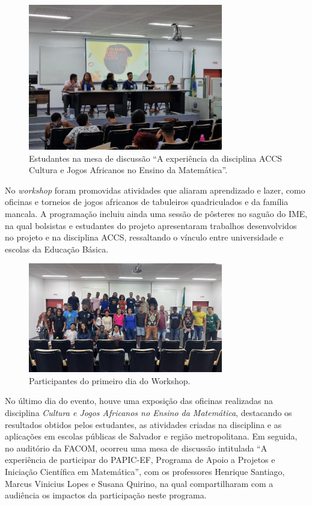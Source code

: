 \documentclass{hipatia}
\begin{document}
\begin{figure}[htb]
    \centering
    \includegraphics[width=8.5cm]{WAM2.jpg}
    \caption{Estudantes na mesa de discussão ``A experiência da disciplina ACCS Cultura e Jogos Africanos no Ensino da Matemática''.}
 \label{WAM2}
\end{figure}

No \textit{workshop} foram promovidas atividades que aliaram aprendizado e lazer, como oficinas e torneios de jogos africanos de tabuleiros quadriculados e da família mancala. A programação incluiu ainda uma sessão de pôsteres no saguão do IME, na qual bolsistas e estudantes do projeto apresentaram trabalhos desenvolvidos no projeto e na disciplina ACCS, ressaltando o vínculo entre universidade e escolas da Educação Básica.

\begin{figure}[htb]
    \centering
    \includegraphics[width=8.5cm]{WAM3.jpg}
    \caption{Participantes do primeiro dia do Workshop.}
 \label{WAM3}
\end{figure}

No último dia do evento, houve uma exposição das oficinas realizadas na disciplina \textit{Cultura e Jogos Africanos no Ensino da Matemática}, destacando os resultados obtidos pelos estudantes, as atividades criadas na disciplina e as aplicações em escolas públicas de Salvador e região metropolitana. Em seguida, no auditório da FACOM, ocorreu uma mesa de discussão intitulada ``A experiência de participar do PAPIC-EF, Programa de Apoio a Projetos e Iniciação Científica em Matemática'', com os professores Henrique Santiago, Marcus Vinicius Lopes e Susana Quirino, na qual compartilharam com a audiência os impactos da participação neste programa.
\end{document}
